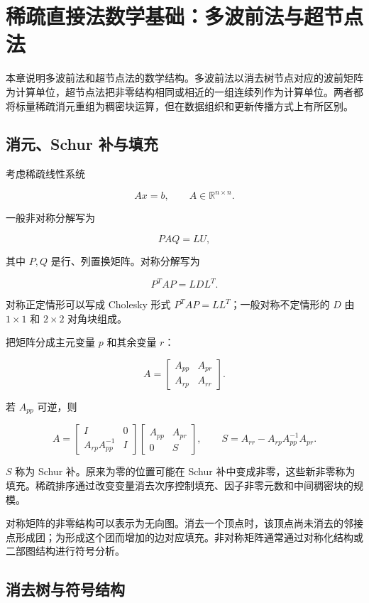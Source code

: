 \chapter{稀疏直接法数学基础：多波前法与超节点法}

本章说明多波前法和超节点法的数学结构。多波前法以消去树节点对应的波前矩阵为计算单位，超节点法把非零结构相同或相近的一组连续列作为计算单位。两者都将标量稀疏消元重组为稠密块运算，但在数据组织和更新传播方式上有所区别\cite{liu1992,davis2006,demmel1999}。

\section{消元、Schur 补与填充}

考虑稀疏线性系统

\[
Ax=b,\qquad A\in\mathbb{R}^{n\times n}.
\]

一般非对称分解写为

\[
PAQ=LU,
\]

其中 $P,Q$ 是行、列置换矩阵。对称分解写为

\[
P^TAP=LDL^T.
\]

对称正定情形可以写成 Cholesky 形式 $P^TAP=LL^T$；一般对称不定情形的 $D$ 由 $1\times1$ 和 $2\times2$ 对角块组成。

把矩阵分成主元变量 $p$ 和其余变量 $r$：

\[
A=
\begin{bmatrix}
A_{pp}&A_{pr}\\
A_{rp}&A_{rr}
\end{bmatrix}.
\]

若 $A_{pp}$ 可逆，则

\[
A=
\begin{bmatrix}
I&0\\
A_{rp}A_{pp}^{-1}&I
\end{bmatrix}
\begin{bmatrix}
A_{pp}&A_{pr}\\
0&S
\end{bmatrix},
\qquad
S=A_{rr}-A_{rp}A_{pp}^{-1}A_{pr}.
\]

$S$ 称为 Schur 补。原来为零的位置可能在 Schur 补中变成非零，这些新非零称为填充。稀疏排序通过改变变量消去次序控制填充、因子非零元数和中间稠密块的规模。

对称矩阵的非零结构可以表示为无向图。消去一个顶点时，该顶点尚未消去的邻接点形成团；为形成这个团而增加的边对应填充。非对称矩阵通常通过对称化结构或二部图结构进行符号分析。

\section{消去树与符号结构}

